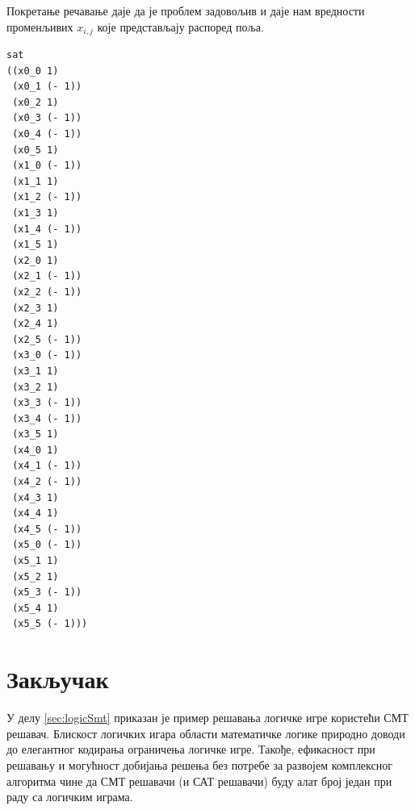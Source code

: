 \documentclass[a4paper]{article}
\begin{document}
Покретање речавање даје да је проблем задовољив и даје нам вредности променљивих $x_{i, j}$ које представљају
распоред поља.

\begin{verbatim}
sat
((x0_0 1)
 (x0_1 (- 1))
 (x0_2 1)
 (x0_3 (- 1))
 (x0_4 (- 1))
 (x0_5 1)
 (x1_0 (- 1))
 (x1_1 1)
 (x1_2 (- 1))
 (x1_3 1)
 (x1_4 (- 1))
 (x1_5 1)
 (x2_0 1)
 (x2_1 (- 1))
 (x2_2 (- 1))
 (x2_3 1)
 (x2_4 1)
 (x2_5 (- 1))
 (x3_0 (- 1))
 (x3_1 1)
 (x3_2 1)
 (x3_3 (- 1))
 (x3_4 (- 1))
 (x3_5 1)
 (x4_0 1)
 (x4_1 (- 1))
 (x4_2 (- 1))
 (x4_3 1)
 (x4_4 1)
 (x4_5 (- 1))
 (x5_0 (- 1))
 (x5_1 1)
 (x5_2 1)
 (x5_3 (- 1))
 (x5_4 1)
 (x5_5 (- 1)))
\end{verbatim}


\section{Закључак}
У делу \ref{sec:logicSmt} приказан је пример решавања логичке игре користећи СМТ решавач. Блискост логичких игара области математичке
логике природно доводи до елегантног кодирања ограничења логичке игре. Такође, ефикасност при решавању и могућност добијања
решења без потребе за развојем комплексног алгоритма чине да СМТ решавачи (и САТ решавачи) буду алат број један при раду
са логичким играма.


\newpage

\appendix


\end{document}
